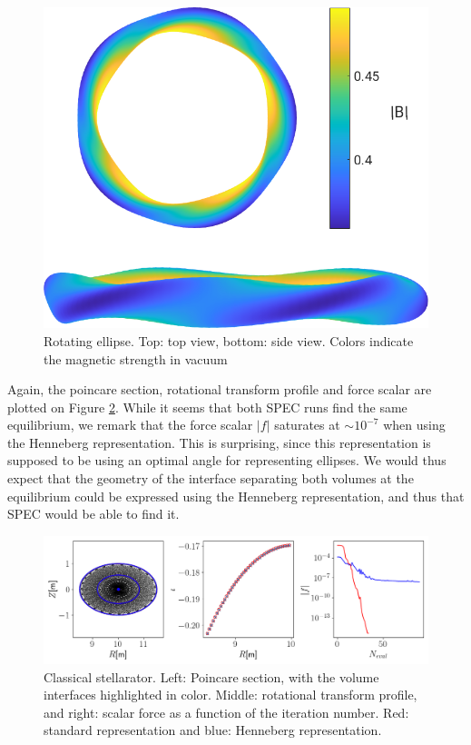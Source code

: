 \documentclass[my_thesis.tex]{subfiles}
\begin{document}
\begin{figure}
	\centering
	\includegraphics[width=.8\linewidth]{images/HennebergRepresentation/RotatingEllipse_modB_boundary.png}
	\caption{Rotating ellipse. Top: top view, bottom: side view. Colors indicate the magnetic strength in vacuum}
	\label{fig. rotating ellipse geometry}
\end{figure}


Again, the poincare section, rotational transform profile and force scalar are plotted on Figure \ref{fig. classical stellarator henneberg representation}. While it seems that both SPEC runs find the same equilibrium, we remark that the force scalar $|f|$ saturates at $\sim 10^{-7}$ when using the Henneberg representation. This is surprising, since this representation is supposed to be using an optimal angle for representing ellipses. We would thus expect that the geometry of the interface separating both volumes at the equilibrium could be expressed using the Henneberg representation, and thus that SPEC would be able to find it.

\begin{figure}
	\centering
	\includegraphics[width=\linewidth]{images/HennebergRepresentation/RotatingEllipse.png}
	\caption{Classical stellarator. Left: Poincare section, with the volume interfaces highlighted in color. Middle: rotational transform profile, and right: scalar force as a function of the iteration number. Red: standard representation and blue: Henneberg representation.}
	\label{fig. classical stellarator henneberg representation}
\end{figure}
\end{document}
